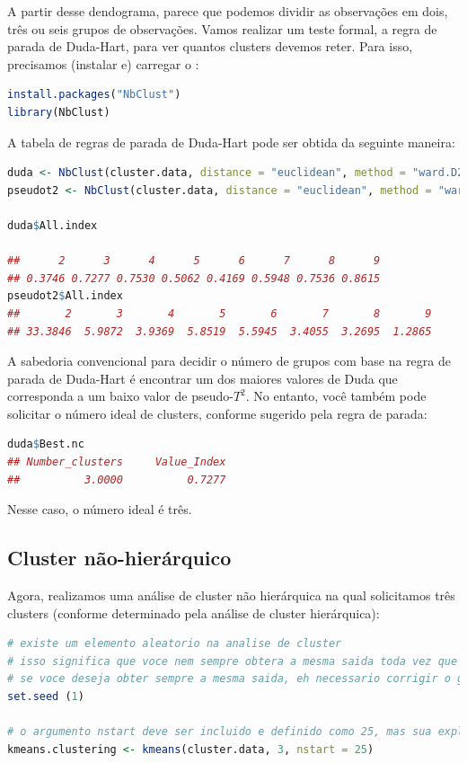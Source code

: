 \documentclass{article}
\begin{document}
A partir desse dendograma, parece que podemos dividir as observações em dois, três ou seis grupos de observações. Vamos realizar um teste formal, a regra de parada de Duda-Hart, para ver quantos clusters devemos reter. Para isso, precisamos (instalar e) carregar o :

\begin{lstlisting}[language=R]
install.packages("NbClust")
library(NbClust)
\end{lstlisting}

A tabela de regras de parada de Duda-Hart pode ser obtida da seguinte maneira:

\begin{lstlisting}[language=R]
duda <- NbClust(cluster.data, distance = "euclidean", method = "ward.D2", max.nc = 9, index = "duda")
pseudot2 <- NbClust(cluster.data, distance = "euclidean", method = "ward.D2", max.nc = 9, index = "pseudot2")

duda$All.index

##      2      3      4      5      6      7      8      9 
## 0.3746 0.7277 0.7530 0.5062 0.4169 0.5948 0.7536 0.8615
pseudot2$All.index
##       2       3       4       5       6       7       8       9 
## 33.3846  5.9872  3.9369  5.8519  5.5945  3.4055  3.2695  1.2865
\end{lstlisting}


A sabedoria convencional para decidir o número de grupos com base na regra de parada de Duda-Hart é encontrar um dos maiores valores de Duda que corresponda a um baixo valor de pseudo-$T^2$. No entanto, você também pode solicitar o número ideal de clusters, conforme sugerido pela regra de parada:

\begin{lstlisting}[language=R]
duda$Best.nc
## Number_clusters     Value_Index 
##          3.0000          0.7277
\end{lstlisting}

Nesse caso, o número ideal é três.

\newpage

\subsection{Cluster não-hierárquico}

Agora, realizamos uma análise de cluster não hierárquica na qual solicitamos três clusters (conforme determinado pela análise de cluster hierárquica):

\begin{lstlisting}[language=R]
# existe um elemento aleatorio na analise de cluster
# isso significa que voce nem sempre obtera a mesma saida toda vez que fizer uma analise de cluster
# se voce deseja obter sempre a mesma saida, eh necessario corrigir o gerador de numeros aleatorios de R com o comando set.seed
set.seed (1)

# o argumento nstart deve ser incluido e definido como 25, mas sua explicacao esta fora do escopo deste tutorial
kmeans.clustering <- kmeans(cluster.data, 3, nstart = 25)
\end{lstlisting}
\end{document}
